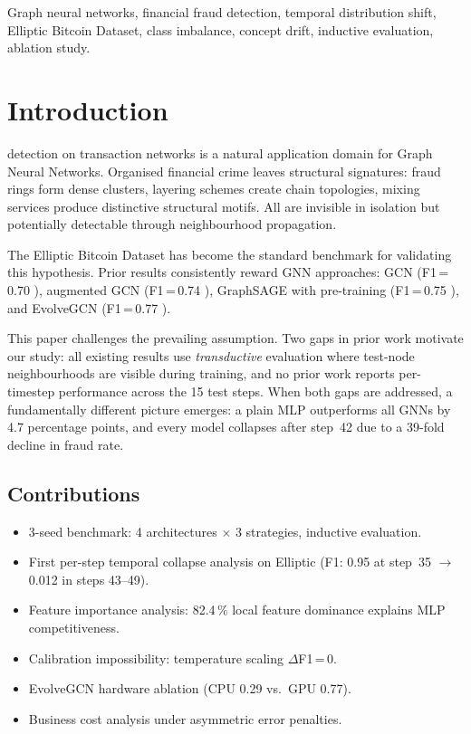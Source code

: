 \documentclass[journal,10pt,twoside]{IEEEtran}
\begin{document}
\begin{IEEEkeywords}
Graph neural networks, financial fraud detection, temporal distribution
shift, Elliptic Bitcoin Dataset, class imbalance, concept drift,
inductive evaluation, ablation study.
\end{IEEEkeywords}

\section{Introduction}
\label{sec:intro}

 detection on transaction networks is a natural
application domain for Graph Neural Networks. Organised financial crime
leaves structural signatures: fraud rings form dense clusters, layering
schemes create chain topologies, mixing services produce distinctive
structural motifs. All are invisible in isolation but potentially
detectable through neighbourhood propagation.

The Elliptic Bitcoin Dataset \cite{weber2019} has become the standard
benchmark for validating this hypothesis. Prior results consistently
reward GNN approaches: GCN (F1\,=\,0.70 \cite{weber2019}), augmented GCN
(F1\,=\,0.74 \cite{alarab2020}), GraphSAGE with pre-training
(F1\,=\,0.75 \cite{lo2023}), and EvolveGCN (F1\,=\,0.77
\cite{pareja2020evolvegcn}).

This paper challenges the prevailing assumption. Two gaps in prior work
motivate our study: all existing results use \emph{transductive}
evaluation where test-node neighbourhoods are visible during training,
and no prior work reports per-timestep performance across the 15 test
steps. When both gaps are addressed, a fundamentally different picture
emerges: a plain MLP outperforms all GNNs by 4.7 percentage points,
and every model collapses after step~42 due to a 39-fold decline in
fraud rate.

\subsection*{Contributions}
\begin{itemize}[leftmargin=*,nosep]
\item 3-seed benchmark: 4 architectures $\times$ 3 strategies, inductive
  evaluation.
\item First per-step temporal collapse analysis on Elliptic
  (F1: 0.95 at step~35 $\to$ 0.012 in steps 43--49).
\item Feature importance analysis: 82.4\,\% local feature dominance
  explains MLP competitiveness.
\item Calibration impossibility: temperature scaling $\Delta$F1\,=\,0.
\item EvolveGCN hardware ablation (CPU 0.29 vs.\ GPU 0.77).
\item Business cost analysis under asymmetric error penalties.
\end{itemize}
\end{document}
